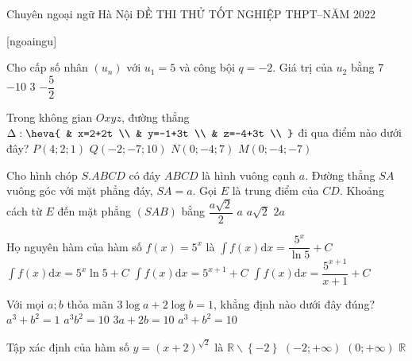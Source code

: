 \begin{name}
{Chuyên ngoại ngữ Hà Nội}
{ĐỀ THI THỬ TỐT NGHIỆP THPT--NĂM 2022 }
\end{name}
[ngoaingu]
\begin{ex} %
Cho cấp số nhân $( {{u}_{n}} )$ với ${{u}_{1}}=5$ và công bội $q=-2$. Giá trị của ${{u}_{2}}$ bằng 
\choice 
{ $7$}
{ \True $-10$}
{ $3$}
{ $-\dfrac{5}{2}$} \end{ex} 
\begin{ex} %
Trong không gian $Oxyz$, đường thẳng $\Delta:\heva{
& x=2+2t \\ 
& y=-1+3t \\ 
& z=-4+3t \\ 
}$ đi qua điểm nào dưới đây? 
\choice 
{  $P( 4;2;1 )$}
{ $Q( -2;-7;10 )$} 
{ $N( 0;-4;7 )$}
{ \True $M( 0;-4;-7 )$} \end{ex} 
\begin{ex} %
Cho hình chóp $S.ABCD$ có đáy $ABCD$ là hình vuông cạnh $a$. Đường thẳng $SA$ vuông góc với mặt phẳng đáy, $SA=a$. Gọi $E$ là trung điểm của $CD$. Khoảng cách từ $E$ đến mặt phẳng $( SAB )$ bằng
\choice 
{ $\dfrac{a\sqrt{2}}{2}$}
{ \True $a$}
{ $a\sqrt{2}$}
{ $2a$} \end{ex} 
\begin{ex} %
Họ nguyên hàm của hàm số $f( x )={{5}^{x}}$ là
\choice 
{ \True $\int {f(x) \mathrm{d} x}=\dfrac{{{5}^{x}}}{\ln 5}+C$}
{ $\int {f( x ) \mathrm{d} x}={{5}^{x}}\ln 5+C$} 
{ $\int {f( x ) \mathrm{d} x}={{5}^{x+1}}+C$}
{ $\int {f( x ) \mathrm{d} x}=\dfrac{5^{x+1}}{x+1}+C$} 
\end{ex} 
\begin{ex} %
Với mọi $a;b$ thỏa mãn $3\log a+2\log b=1$, khẳng định nào dưới đây đúng? 
\choice 
{ ${{a}^3}+b^2=1$}
{ \True ${{a}^3}b^2=10$}
{ $3a+2b=10$}
{ ${{a}^3}+b^2=10$} \end{ex} 
\begin{ex} %
\end{ex} 
\begin{ex} %
Tập xác định của hàm số $y={{( x+2 )}^{\sqrt{2}}}$ là
\choice 
{ $\mathbb{R}\backslash \left\{ -2 \right\}$}
{ \True $( -2;+\infty )$}
{ $( 0;+\infty )$}
{ $\mathbb{R}$} \end{ex} 
